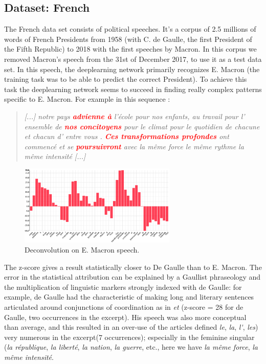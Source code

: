 \subsection{Dataset: French}
\label{subsec:dataset:fr}

The French data set consists of political speeches. It's a corpus of 2.5 millions of words of French Presidents from 1958 (with C. de Gaulle, the first President of the Fifth Republic) to 2018 with the first speeches by Macron. In this corpus we removed Macron's speech from the 31st of December 2017, to use it as a test data set. In this speech, the deeplearning network primarily recognizes E. Macron (the training task was to be able to predict the correct President). To achieve this task the deeplearning network seems to succeed in finding really complex patterns specific to E. Macron. For example in this sequence :

\begin{quote}
\textit{[...] notre pays \textcolor{red}{\textbf{advienne à}} l'école pour nos enfants, au travail pour l' ensemble de \textcolor{red}{\textbf{nos concitoyens}} pour le climat pour le quotidien de chacune et chacun d' entre vous . \textcolor{red}{\textbf{Ces transformations profondes}} ont commencé et se \textcolor{red}{\textbf{poursuivront}} avec la même force le même rythme la même intensité [...]} 
\end{quote}

\begin{figure}[h]
\begin{center}
\includegraphics[width=7.5cm]{img/macron_activation.png}
\caption{Deconvolution on E. Macron speech.}
\label{macron_activation}
\end{center}
\end{figure}

The z-score gives a result statistically closer to De Gaulle than to E. Macron. The error in the statistical attribution can be explained by a Gaullist phraseology and the multiplication of linguistic markers strongly indexed with de Gaulle: for example, de Gaulle had the characteristic of making long and literary sentences articulated around conjunctions of coordination as in \textit{et} (z-score = 28 for de Gaulle, two occurrences in the excerpt). His speech was also more conceptual than average, and this resulted in an over-use of the articles defined \textit{le}, \textit{la}, \textit{l\'}, \textit{les}) very numerous in the excerpt(7 occurrences); especially in the feminine singular (\textit{la république}, \textit{la liberté}, \textit{la nation}, \textit{la guerre}, etc., here we have \textit{la même force}, \textit{la même intensité}.

